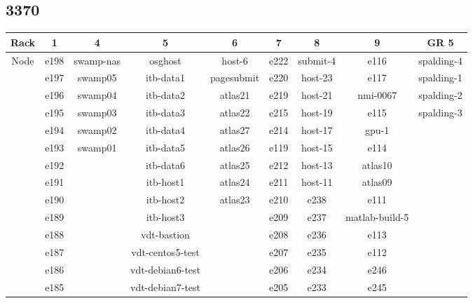 \documentclass[10pt,letterpaper]{article}
\begin{document}
    \subsection{3370}
        \begin{center}
        \begin{tabular}{ |c|c|c|c|c|c|c|c|c| }
        \hline
        Rack & 1 & 4 & 5 & 6 & 7 & 8 & 9 & GR 5 \\
        \hline
        \multirow{1}{3em}{Node}

        & e198 & swamp-nas & osghost        & host-6     & e222    & submit-4 & e116           & spalding-4 \\
        & e197 & swamp05 & itb-data1        & pagesubmit & e220    & host-23  & e117           & spalding-1 \\
        & e196 & swamp04 & itb-data2        & atlas21    & e219    & host-21  & nmi-0067       & spalding-2 \\
        & e195 & swamp03 & itb-data3        & atlas22    & e215    & host-19  & e115           & spalding-3 \\
        & e194 & swamp02 & itb-data4        & atlas27    & e214    & host-17  & gpu-1          &            \\
        & e193 & swamp01 & itb-data5        & atlas26    & e119    & host-15  & e114           &            \\
        & e192 &         & itb-data6        & atlas25    & e212    & host-13  & atlas10        &            \\
        & e191 &         & itb-host1        & atlas24    & e211    & host-11  & atlas09        &            \\
        & e190 &         & itb-host2        & atlas23    & e210    & e238     & e111           &            \\
        & e189 &         & itb-host3        &            & e209    & e237     & matlab-build-5 &            \\
        & e188 &         & vdt-bastion      &            & e208    & e236     & e113           &            \\
        & e187 &         & vdt-centos5-test &            & e207    & e235     & e112           &            \\
        & e186 &         & vdt-debian6-test &            & e206    & e234     & e246           &            \\
        & e185 &         & vdt-debian7-test &            & e205    & e233     & e245           &            \\

\end{tabular}
\end{center}
\end{document}
